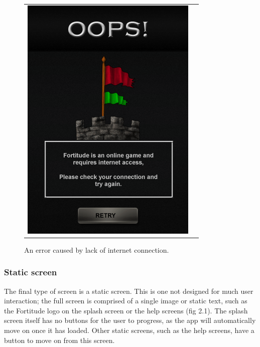 \begin{figure}[h!]
\begin{tabular}{cc}
\begin{minipage}{0.3\textwidth}
\begin{center}
\begin{minipage}{0.83\textwidth}
		\includegraphics[width=\textwidth]{images/error_mockup}
	\caption{An error caused by lack of internet connection.}
		\end{minipage}
		\end{center}
	\end{minipage}
	
\end{tabular}
\vspace{-0pt}
\end{figure}

\subsubsection{Static screen}

The final type of screen is a static screen. This is one not designed for much user interaction; the full screen is comprised of a single image or static text, such as the Fortitude logo on the splash screen or the help screens (fig 2.1). The splash screen itself has no buttons for the user to progress, as the app will automatically move on once it has loaded. Other static screens, such as the help screens, have a button to move on from this screen.

